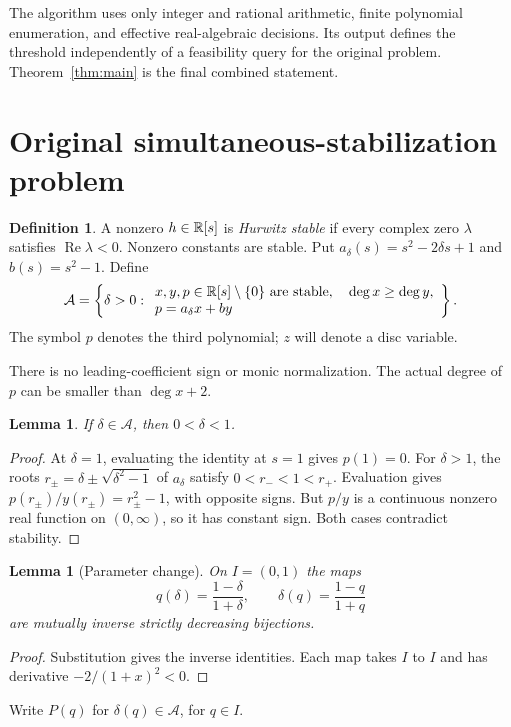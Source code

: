 \documentclass[11pt,a4paper]{article}
\newtheorem{lemma}[theorem]{Lemma}
\theoremstyle{definition}\newtheorem{definition}[theorem]{Definition}
\theoremstyle{remark}\newtheorem{remark}[theorem]{Remark}
\newcommand{\Adm}{\mathcal A}\newcommand{\F}{\mathcal F}
\begin{document}
The algorithm uses only integer and rational arithmetic, finite polynomial
enumeration, and effective real-algebraic decisions. Its output defines
the threshold independently of a feasibility query for the original
problem. Theorem~\ref{thm:main} is the final combined statement.

\section{Original simultaneous-stabilization problem}\label{sec:original}
\begin{definition}\label{def:original}
A nonzero $h\in\mathbb R[s]$ is \emph{Hurwitz stable} if every complex zero
$\lambda$ satisfies $\operatorname{Re}\lambda<0$. Nonzero constants are
stable. Put $a_\delta(s)=s^2-2\delta s+1$ and $b(s)=s^2-1$. Define
\begin{equation}\label{eq:original}
\Adm=\left\{\delta>0:\begin{array}{l}
 x,y,p\in\R[s]\setminus\{0\}\text{ are stable},\quad\deg x\geq\deg y,\\
 p=a_\delta x+by
\end{array}\right\}.
\end{equation}
The symbol $p$ denotes the third polynomial; $z$ will denote a disc variable.
\end{definition}
There is no leading-coefficient sign or monic normalization. The actual
degree of $p$ can be smaller than $\deg x+2$.

\begin{lemma}\label{lem:belowone}
If $\delta\in\Adm$, then $0<\delta<1$.
\end{lemma}
\begin{proof}
At $\delta=1$, evaluating the identity at $s=1$ gives $p(1)=0$.
For $\delta>1$, the roots $r_\pm=\delta\pm\sqrt{\delta^2-1}$ of
$a_\delta$ satisfy $0<r_-<1<r_+$. Evaluation gives
$p(r_\pm)/y(r_\pm)=r_\pm^2-1$, with opposite signs. But $p/y$ is a
continuous nonzero real function on $(0,\infty)$, so it has constant sign.
Both cases contradict stability.
\end{proof}

\begin{lemma}[Parameter change]\label{lem:parameters}
On $I=(0,1)$ the maps
\begin{equation}\label{eq:parameters}
 q(\delta)=\frac{1-\delta}{1+\delta},\qquad
 \delta(q)=\frac{1-q}{1+q}
\end{equation}
are mutually inverse strictly decreasing bijections.
\end{lemma}
\begin{proof}
Substitution gives the inverse identities. Each map takes $I$ to $I$
and has derivative $-2/(1+x)^2<0$.
\end{proof}
Write $P(q)$ for $\delta(q)\in\Adm$, for $q\in I$.
\end{document}
